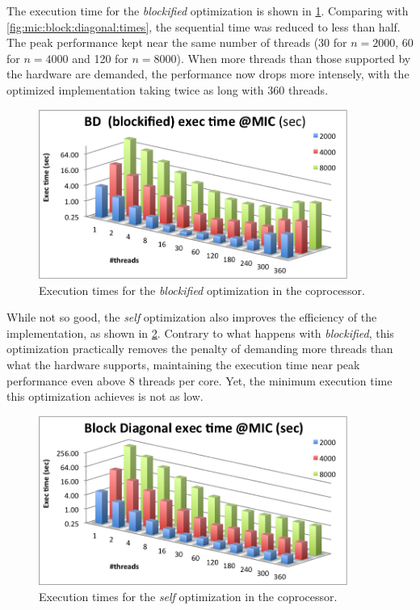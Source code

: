 \documentclass[../thesis]{subfiles}
\begin{document}
	The execution time for the \emph{blockified} optimization is shown in \cref{fig:mic:optims:blockified:times}. Comparing with \cref{fig:mic:block:diagonal:times}, the sequential time was reduced to less than half. The peak performance kept near the same number of threads (30 for $n=2000$, 60 for $n=4000$ and 120 for $n=8000$). When more threads than those supported by the hardware are demanded, the performance now drops more intensely, with the optimized implementation taking twice as long with 360 threads.

	\begin{figure}[p]
		\begin{center}
			\includegraphics[width=0.9\textwidth]{assets/images/mic/optims/mic-blockified.png}
		\end{center}
		\caption{Execution times for the \emph{blockified} optimization in the \intel\xeonphi coprocessor.}
		\label{fig:mic:optims:blockified:times}
	\end{figure}

	While not so good, the \emph{self} optimization also improves the efficiency of the implementation, as shown in \cref{fig:mic:optims:self:times}. Contrary to what happens with \emph{blockified}, this optimization practically removes the penalty of demanding more threads than what the hardware supports, maintaining the execution time near peak performance even above 8 threads per core. Yet, the minimum execution time this optimization achieves is not as low.

	\begin{figure}[p]
		\begin{center}
			\includegraphics[width=0.9\textwidth]{assets/images/mic/optims/mic-self.png}
		\end{center}
		\caption{Execution times for the \emph{self} optimization in the \intel\xeonphi coprocessor.}
		\label{fig:mic:optims:self:times}
	\end{figure}
\end{document}
